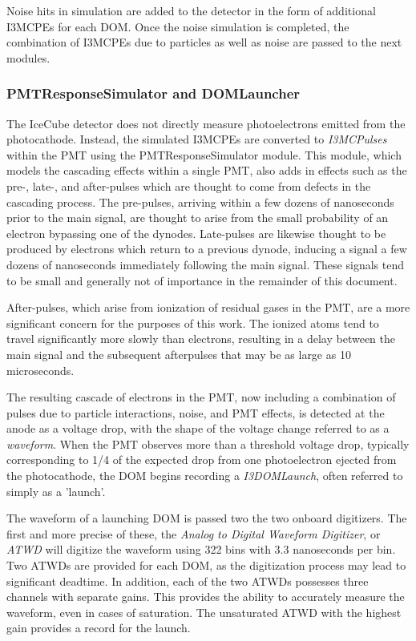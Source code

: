 Noise hits in simulation are added to the detector in the form of additional I3MCPEs for each DOM. Once the noise simulation is completed, the combination of I3MCPEs due to particles as well as noise are passed to the next modules.

\subsubsection{PMTResponseSimulator and DOMLauncher}
The IceCube detector does not directly measure photoelectrons emitted from the photocathode. 
Instead, the simulated I3MCPEs are converted to \emph{I3MCPulses} within the PMT using the PMTResponseSimulator module.
This module, which models the cascading effects within a single PMT, also adds in effects such as the pre-, late-, and after-pulses which are thought to come from defects in the cascading process.
The pre-pulses, arriving within a few dozens of nanoseconds prior to the main signal, are thought to arise from the small probability of an electron bypassing one of the dynodes. 
Late-pulses are likewise thought to be produced by electrons which return to a previous dynode, inducing a signal a few dozens of nanoseconds immediately following the main signal.
These signals tend to be small and generally not of importance in the remainder of this document.

After-pulses, which arise from ionization of residual gases in the PMT, are a more significant concern for the purposes of this work. 
The ionized atoms tend to travel significantly more slowly than electrons, resulting in a  delay between the main signal and the subsequent afterpulses that may be as large as 10 microseconds.

The resulting cascade of electrons in the PMT, now including a combination of pulses due to particle interactions, noise, and PMT effects, is detected at the anode as a voltage drop, with the shape of the voltage change referred to as a \emph{waveform}. 
When the PMT observes more than a threshold voltage drop, typically corresponding to 1/4 of the expected drop from one photoelectron ejected from the photocathode, the DOM begins recording a \emph{I3DOMLaunch}, often referred to simply as a 'launch'. 

The waveform of a launching DOM is passed two the two onboard digitizers.
The first and more precise of these, the \emph{Analog to Digital Waveform Digitizer}, or \emph{ATWD} will digitize the waveform using 322 bins with 3.3 nanoseconds per bin. 
Two ATWDs are provided for each DOM, as the digitization process may lead to significant deadtime.
In addition, each of the two ATWDs possesses three channels with separate gains.
This provides the ability to accurately measure the waveform, even in cases of saturation.
The unsaturated ATWD with the highest gain provides a record for the launch.

